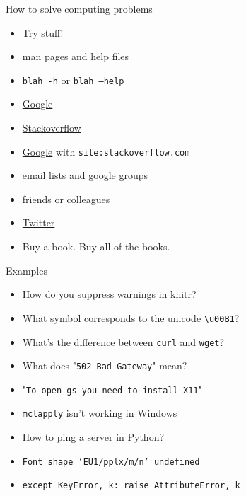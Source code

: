 \documentclass[12pt,t]{beamer}
\newcommand{\bi}{\begin{itemize}}
\newcommand{\ei}{\end{itemize}}
\begin{document}
\begin{frame}{How to solve computing problems}

\vspace{24pt}

\bi
\item {\color{vhilight} Try stuff!}
\item man pages and help files
\item {\tt blah -h} or {\tt blah --help}
\item \href{http://www.google.com}{Google}
\item \href{http://stackoverflow.com}{Stackoverflow}
\item \href{http://www.google.com}{Google} with {\tt site:stackoverflow.com}
\item email lists and google groups
\item friends or colleagues
\item \href{http://twitter.com}{Twitter}
\item Buy a book. Buy {\color{vhilight} all} of the books.
\ei

\end{frame}


\begin{frame}{Examples}

\vspace{24pt}

\bi
\item How do you suppress warnings in knitr?
\item What symbol corresponds to the unicode {\tt {\textbackslash}u00B1}?
\item What's the difference between {\tt curl} and {\tt wget}?
\item What does "{\tt 502 Bad Gateway}" mean?
\item "{\tt To open gs you need to install X11}"
\item {\tt mclapply} isn't working in Windows
\item How to ping a server in Python?
\item {\tt Font shape `EU1/pplx/m/n' undefined}
\item {\tt except KeyError, k: raise AttributeError, k}
\ei

\end{frame}
\end{document}
